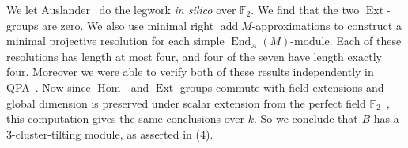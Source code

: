 \documentclass[11pt,a4paper,reqno]{amsart}
\newcommand{\kk}{k}
\theoremstyle{definition}
\DeclareMathOperator{\Hom}{Hom}
\DeclareMathOperator{\End}{End}
\DeclareMathOperator{\Ext}{Ext}
\DeclareMathOperator{\add}{add}
\begin{document}
We let Auslander~\cite{Auslander} do the legwork \textit{in silico}
over $\mathbb F_{2}$.  We find that the two $\Ext$-groups are zero.
We also use minimal right $\add M$-approximations to construct a
minimal projective resolution for each simple $\End_{A}(M)$-module.
Each of these resolutions has length at most four, and four of the
seven have length exactly four.  Moreover we were able to verify both
of these results independently in QPA~\cite{QPA}.  Now since $\Hom$-
and $\Ext$-groups commute with field extensions and global dimension
is preserved under scalar extension from the perfect field
$\mathbb F_{2}$~\cite[Lemma 1.1(2)]{BM}, this computation gives the
same conclusions over $\kk$.  So we conclude that $B$ has a
$3$-cluster-tilting module, as asserted in (4).


{\small\raggedright
  }
\end{document}
